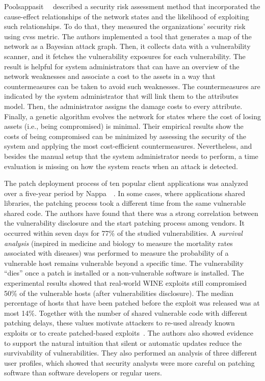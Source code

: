 Poolsappasit~\etal{}~\cite{Poolsappasit:2012} described a security risk assessment method that incorporated the cause-effect relationships of the network states and the likelihood of exploiting such relationships.
To do that, they measured the organizations' security risk using \gls{cvss} metric.
The authors implemented a tool that generates a map of the network as a Bayesian attack graph.
Then, it collects data with a vulnerability scanner, and it fetches the vulnerability exposures for each vulnerability.
The result is helpful for system administrators that can have an overview of the network weaknesses and associate a cost to the assets in a way that countermeasures can be taken to avoid such weaknesses.
The countermeasures are indicated by the system administrator that will link them to the attributes model.
Then, the administrator assigns the damage costs to every attribute.
Finally, a genetic algorithm evolves the network for states where the cost of losing assets (i.e., being compromised) is minimal. 
Their empirical results show the costs of being compromised can be minimized by assessing the security of the system and applying the most cost-efficient countermeasures.
Nevertheless, and besides the manual setup that the system administrator needs to perform, a time evaluation is missing on how the system reacts when an attack is detected.


The patch deployment process of ten popular client applications was analyzed over a five-year period by Nappa~\etal{}~\cite{Nappa:2015}.
In some cases, where applications shared libraries, the patching process took a different time from the same vulnerable shared code.
The authors have found that there was a strong correlation between the vulnerability disclosure and the start patching process among vendors.
It occurred within seven days for 77\% of the studied vulnerabilities.
A \emph{survival analysis} (inspired in medicine and biology to measure the mortality rates associated with diseases) was performed to measure the probability of a vulnerable host remains vulnerable beyond a specific time.
The vulnerability ``dies'' once a patch is installed or a non-vulnerable software is installed.
The experimental results showed that real-world WINE exploits still compromised 50\% of the vulnerable hosts (after vulnerabilities disclosure). 
The median percentage of hosts that have been patched before the exploit was released was at most 14\%.
Together with the number of shared vulnerable code with different patching delays, these values motivate attackers to re-used already known exploits or to create patched-based exploits~\cite{Brumley:2008}.
The authors also showed evidence to support the natural intuition that silent or automatic updates reduce the survivability of vulnerabilities. 
They also performed an analysis of three different user profiles, which showed that security analysts were more careful on patching software than software developers or regular users.



